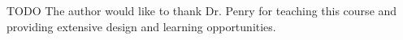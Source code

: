 \documentclass[prodmode,acmtecs]{acmsmall} %
\begin{document}
\begin{acks}
TODO The author would like to thank Dr. Penry for teaching this course and
providing extensive design and learning opportunities.
\end{acks}

% 
% 

\end{document}
